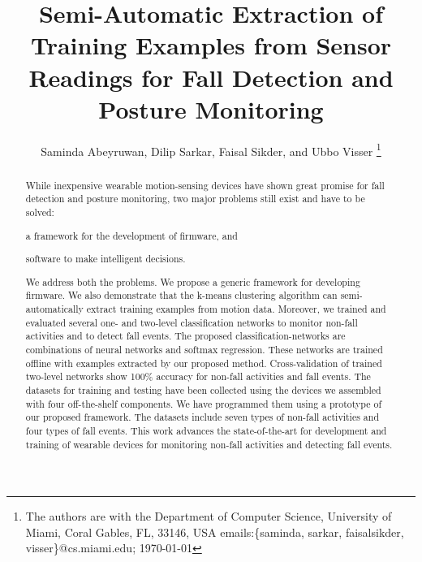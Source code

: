\documentclass[]{IEEEtran}
\title{Semi-Automatic Extraction of Training Examples from Sensor Readings for Fall Detection and Posture Monitoring}
\author{{Saminda Abeyruwan}, {Dilip Sarkar}, {Faisal Sikder}, and {Ubbo Visser}
\thanks{The authors are with the Department of Computer Science, University of Miami,
  Coral Gables, FL, 33146, USA
{ emails:\{saminda, sarkar, faisalsikder, visser\}@cs.miami.edu};
\today} }
\begin{document}
\maketitle
\IEEEpeerreviewmaketitle

\begin{abstract}
While inexpensive wearable motion-sensing devices have shown great promise for fall detection and
posture monitoring,  two major problems still exist and have to be solved: \begin{inparaenum}  \item
a framework for the development of firmware, and \item software to make intelligent decisions.
\end{inparaenum} We address both the problems.  
We propose a generic framework for developing firmware. We also demonstrate that the k-means
clustering algorithm can semi-automatically extract training examples from motion data. 
Moreover, we trained and evaluated several one- and two-level classification networks to monitor 
non-fall activities and to detect fall events.
The proposed classification-networks are combinations of neural  networks
and softmax regression. 
These networks are trained offline with examples extracted  by our proposed method. Cross-validation
of trained two-level networks show 100\% accuracy for non-fall activities and fall events. The
datasets for training and testing have been collected using the devices we assembled with four
off-the-shelf components. We have programmed them using a prototype of our proposed framework. The
datasets include seven types of non-fall activities and four types of fall events.
This work advances the state-of-the-art for development and training of wearable devices for
monitoring non-fall activities and detecting fall events.
%
%
%

\end{abstract}
\end{document}
